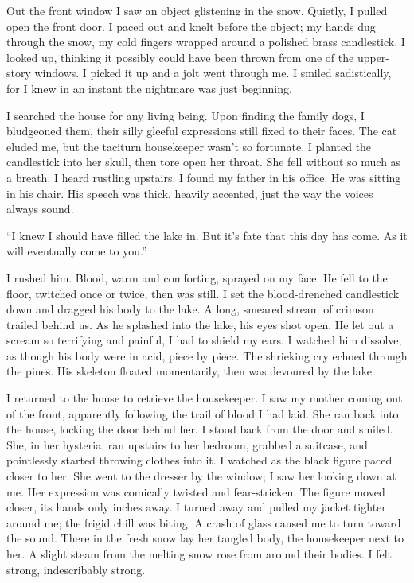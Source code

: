 \documentclass[
]{article}
\begin{document}
Out the front window I saw an object glistening in the snow. Quietly, I
pulled open the front door. I paced out and knelt before the object; my
hands dug through the snow, my cold fingers wrapped around a polished
brass candlestick. I looked up, thinking it possibly could have been
thrown from one of the upper-story windows. I picked it up and a jolt
went through me. I smiled sadistically, for I knew in an instant the
nightmare was just beginning.

I searched the house for any living being. Upon finding the family dogs,
I bludgeoned them, their silly gleeful expressions still fixed to their
faces. The cat eluded me, but the taciturn housekeeper wasn't so
fortunate. I planted the candlestick into her skull, then tore open her
throat. She fell without so much as a breath. I heard rustling upstairs.
I found my father in his office. He was sitting in his chair. His speech
was thick, heavily accented, just the way the voices always sound.

``I knew I should have filled the lake in. But it's fate that this day
has come. As it will eventually come to you.''

I rushed him. Blood, warm and comforting, sprayed on my face. He fell to
the floor, twitched once or twice, then was still. I set the
blood-drenched candlestick down and dragged his body to the lake. A
long, smeared stream of crimson trailed behind us. As he splashed into
the lake, his eyes shot open. He let out a scream so terrifying and
painful, I had to shield my ears. I watched him dissolve, as though his
body were in acid, piece by piece. The shrieking cry echoed through the
pines. His skeleton floated momentarily, then was devoured by the lake.

I returned to the house to retrieve the housekeeper. I saw my mother
coming out of the front, apparently following the trail of blood I had
laid. She ran back into the house, locking the door behind her. I stood
back from the door and smiled. She, in her hysteria, ran upstairs to her
bedroom, grabbed a suitcase, and pointlessly started throwing clothes
into it. I watched as the black figure paced closer to her. She went to
the dresser by the window; I saw her looking down at me. Her expression
was comically twisted and fear-stricken. The figure moved closer, its
hands only inches away. I turned away and pulled my jacket tighter
around me; the frigid chill was biting. A crash of glass caused me to
turn toward the sound. There in the fresh snow lay her tangled body, the
housekeeper next to her. A slight steam from the melting snow rose from
around their bodies. I felt strong, indescribably strong.
\end{document}

